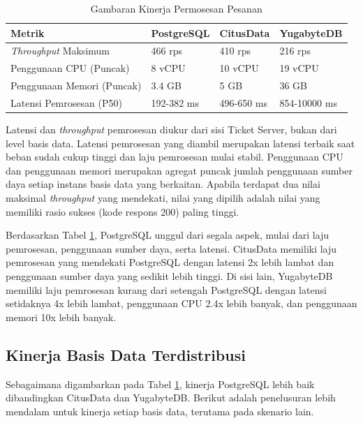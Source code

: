 \begin{table}[H]
    \centering
    \caption{Gambaran Kinerja Permosesan Pesanan}
    \label{table:kinerja-pemrosesan-pesanan}
    \begin{tabular}{|l|l|l|l|}
        \hline
        \textbf{Metrik}              & \textbf{PostgreSQL} & \textbf{CitusData} & \textbf{YugabyteDB} \\
        \hline
        \textit{Throughput} Maksimum & 466 rps             & 410 rps            & 216 rps             \\
        \hline
        Penggunaan CPU (Puncak)      & 8 vCPU              & 10 vCPU            & 19 vCPU             \\
        \hline
        Penggunaan Memori (Puncak)   & 3.4 GB              & 5 GB               & 36 GB               \\
        \hline
        Latensi Pemrosesan (P50)     & 192-382 ms          & 496-650 ms         & 854-10000 ms        \\
        \hline
    \end{tabular}
\end{table}

Latensi dan \textit{throughput} pemrosesan diukur dari sisi Ticket Server, bukan dari level basis data. Latensi pemrosesan yang diambil merupakan latensi terbaik saat beban sudah cukup tinggi dan laju pemrosesan mulai stabil. Penggunaan CPU dan penggunaan memori merupakan agregat puncak jumlah penggunaan sumber daya setiap instans basis data yang berkaitan. Apabila terdapat dua nilai maksimal \textit{throughput} yang mendekati, nilai yang dipilih adalah nilai yang memiliki rasio sukses (kode respons 200) paling tinggi.

Berdasarkan Tabel \ref{table:kinerja-pemrosesan-pesanan}, PostgreSQL unggul dari segala aspek, mulai dari laju pemrosesan, penggunaan sumber daya, serta latensi. CitusData memiliki laju pemrosesan yang mendekati PostgreSQL dengan latensi 2x lebih lambat dan penggunaan sumber daya yang sedikit lebih tinggi. Di sisi lain, YugabyteDB memiliki laju pemrosesan kurang dari setengah PostgreSQL dengan latensi setidaknya 4x lebih lambat, penggunaan CPU 2.4x lebih banyak, dan penggunaan memori 10x lebih banyak.

\subsection{Kinerja Basis Data Terdistribusi}

Sebagaimana digambarkan pada Tabel \ref{table:kinerja-pemrosesan-pesanan}, kinerja PostgreSQL lebih baik dibandingkan CitusData dan YugabyteDB. Berikut adalah penelusuran lebih mendalam untuk kinerja setiap basis data, terutama pada skenario lain.

